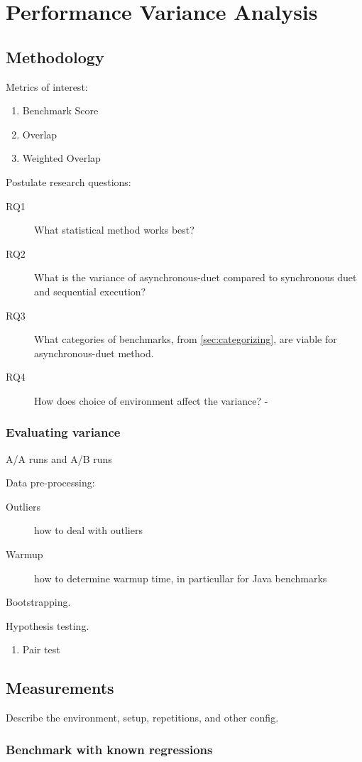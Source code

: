 \chapter{Performance Variance Analysis}
\label{chap:analysis}

\section{Methodology}

Metrics of interest:

\begin{enumerate}
  \item Benchmark Score
  \item Overlap
  \item Weighted Overlap
\end{enumerate}

Postulate research questions:

\begin{description}
  \item[RQ1] What statistical method works best?
  \item[RQ2] What is the variance of asynchronous-duet compared to synchronous duet and sequential execution?
  \item[RQ3] What categories of benchmarks, from \cref{sec:categorizing}, are viable for asynchronous-duet method.
  \item[RQ4] How does choice of environment affect the variance? - \citet{laaber2019software}
\end{description}


\subsection{Evaluating variance}

A/A runs and A/B runs

Data pre-processing:

\begin{description}
  \item[Outliers] how to deal with outliers
  \item[Warmup] how to determine warmup time, in particullar for Java benchmarks
\end{description}

Bootstrapping.

Hypothesis testing.
\begin{enumerate}
  \item Pair test
\end{enumerate}


\section{Measurements}

Describe the environment, setup, repetitions, and other config.

\subsection{Benchmark with known regressions}

